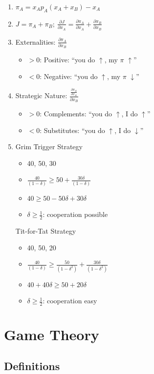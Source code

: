 \documentclass[11pt, english]{article}
\begin{document}
	\begin{enumerate}
	\setlength\itemsep{0cm}
		\item $\pi_A=x_Ap_A(x_A+x_B)-x_A$
		\item $J=\pi_A+\pi_B;\ \frac{\partial J}{\partial x_A}=\frac{\partial\pi_A}{\partial x_A}+\frac{\partial\pi_B}{\partial x_B}$
		\item Externalities: $\frac{\partial\pi_A}{\partial x_B}$
		\begin{itemize}
			\item $>0$: Positive: ``you do $\uparrow$, my $\pi$ $\uparrow$''
			\item $<0$: Negative: ``you do $\uparrow$, my $\pi$ $\downarrow$''
		\end{itemize}
		\item Strategic Nature: $\frac{\frac{\partial\pi_A}{\partial x_A}}{\partial x_B}$
		\begin{itemize}
			\item $>0$: Complements: ``you do $\uparrow$, I do $\uparrow$''
			\item $<0$: Substitutes: ``you do $\uparrow$, I do $\downarrow$''
		\end{itemize}
		\item Grim Trigger Strategy
		\begin{itemize}
			\item 40, 50, 30
			\item $\frac{40}{(1-\delta)}\ge50+\frac{30\delta}{(1-\delta)}$
			\item $40\ge50-50\delta+30\delta$
			\item $\delta\ge\frac{1}{2}$: cooperation possible
		\end{itemize}
		Tit-for-Tat Strategy
		\begin{itemize}
			\item 40, 50, 20
			\item $\frac{40}{(1-\delta)}\ge\frac{50}{(1-\delta^2)}+\frac{30\delta}{(1-\delta^2)}$
			\item $40+40\delta\ge50+20\delta$
			\item $\delta\ge\frac{1}{2}$: cooperation easy
		\end{itemize}
	\end{enumerate}

\newpage

\section{Game Theory}

	\subsection{Definitions}
\end{document}
